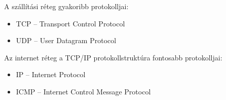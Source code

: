 A szállítási réteg gyakoribb protokolljai:
\begin{itemize}[nosep]
	\item TCP -- Transport Control Protocol
	\item UDP -- User Datagram Protocol
\end{itemize}

Az internet réteg a TCP/IP protokollstruktúra fontosabb protokolljai:
\begin{itemize}[nosep]
	\item IP -- Internet Protocol
	\item ICMP -- Internet Control Message Protocol
\end{itemize}